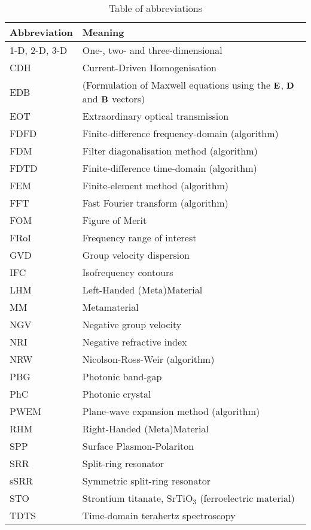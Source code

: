 
\begin{table}[ht]   \caption{Table of abbreviations}  \label{tb_shortcuts} \centering 
\begin{tabular}{ll}
 \toprule
Abbreviation & Meaning	\\
 \hline
1-D, 2-D, 3-D & One-, two- and three-dimensional \\
CDH			& Current-Driven Homogenisation\\
EDB			& (Formulation of Maxwell equations using the $\mathbf{E}$, $\mathbf{D}$ and $\mathbf{B}$ vectors)\\
EOT			& Extraordinary optical transmission \\
FDFD 		& Finite-difference frequency-domain (algorithm)\\
FDM 		& Filter diagonalisation method (algorithm)\\
FDTD 		& Finite-difference time-domain (algorithm)\\
FEM 		& Finite-element method (algorithm)\\
FFT 		& Fast Fourier transform (algorithm)\\
FOM 		& Figure of Merit\\
FRoI 		& Frequency range of interest\\
GVD 		& Group velocity dispersion \\
IFC			& Isofrequency contours\\
LHM			& Left-Handed (Meta)Material\\ 
MM			& Metamaterial\\
NGV 		& Negative group velocity\\
NRI 		& Negative refractive index\\
NRW 		& Nicolson-Ross-Weir (algorithm)\\
PBG			& Photonic band-gap\\
PhC 		& Photonic crystal\\
PWEM 		& Plane-wave expansion method (algorithm)\\
RHM 		& Right-Handed (Meta)Material\\ 
SPP			& Surface Plasmon-Polariton\\		
SRR			& Split-ring resonator\\		
sSRR		& Symmetric split-ring resonator\\
STO			& Strontium titanate, SrTiO$_3$ (ferroelectric material)\\
TDTS 		& Time-domain terahertz spectroscopy\\
 \bottomrule
 \end{tabular} \end{table}


